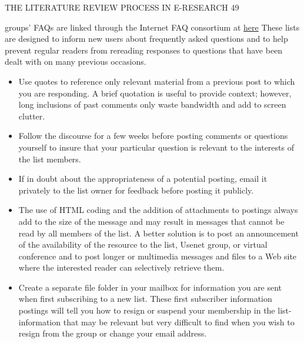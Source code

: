 \documentclass[8pt]{beamer}
\begin{document}
\begin{frame}
\begin{flushright} 
THE LITERATURE REVIEW PROCESS IN E-RESEARCH
\hspace{6mm}
49
\end{flushright} 
\vspace{5mm}

groups' FAQs are linked through the Internet FAQ consortium at
\href{http://www.faqs.org/}{here}
These lists are designed to inform new users about frequently asked questions and to help prevent regular readers from rereading responses to questions that have been dealt with on many previous occasions.

\begin{itemize}
\item 
Use quotes to reference only relevant material from a previous post to which you are responding. A brief quotation is useful to provide context; however, long inclusions of past comments only waste bandwidth and add to screen clutter.
\item 
Follow the discourse for a few weeks before posting comments or questions
yourself to insure that your particular question is relevant to the interests of the
list members.
\item 
If in doubt about the appropriateness of a potential posting, email it privately to
the list owner for feedback before posting it publicly.
\item 
The use of HTML coding and the addition of attachments to postings always add to the size of the message and may result in messages that cannot be read by all members of the list. A better solution is to post an announcement of the availability of the resource to the list, Usenet group, or virtual conference and to post longer or multimedia messages and files to a Web site where the interested reader can selectively retrieve them.
\item 
Create a separate file folder in your mailbox for information you are sent when first subscribing to a new list. These first subscriber information postings will tell you how to resign or suspend your membership in the list-information that may be relevant but very difficult to find when you wish to resign from the group or change your email address.
\end{itemize}
\end{frame}
\end{document}
